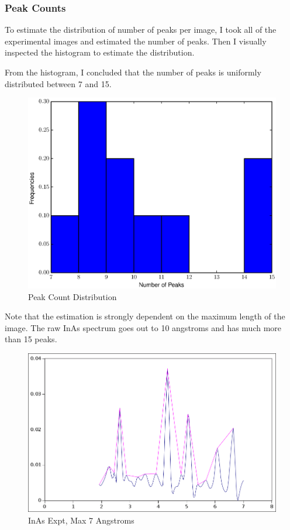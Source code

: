 \documentclass[12pt,letterpaper]{article}
\begin{document}
\subsubsection{Peak Counts}
To estimate the distribution of number of peaks per image, I took all of the
experimental images and estimated the number of peaks. Then I visually inspected
the histogram to estimate the distribution.

From the histogram, I concluded that the number of peaks is uniformly
distributed between 7 and 15.

\begin{figure}[ht]
  \begin{center}
    \includegraphics[scale=0.8]{figs/peak_counts_hist.eps}
    \caption{Peak Count Distribution}
  \end{center}
\end{figure}

Note that the estimation is strongly dependent on the maximum length of the
image. The raw InAs spectrum goes out to 10 angstroms and has much more than 15
peaks.

\begin{figure}[ht]
  \begin{center}
    \includegraphics[scale=0.5]{figs/inas_peaks_7ang.png}
    \caption{InAs Expt, Max 7 Angstroms}
  \end{center}
\end{figure}
\end{document}
